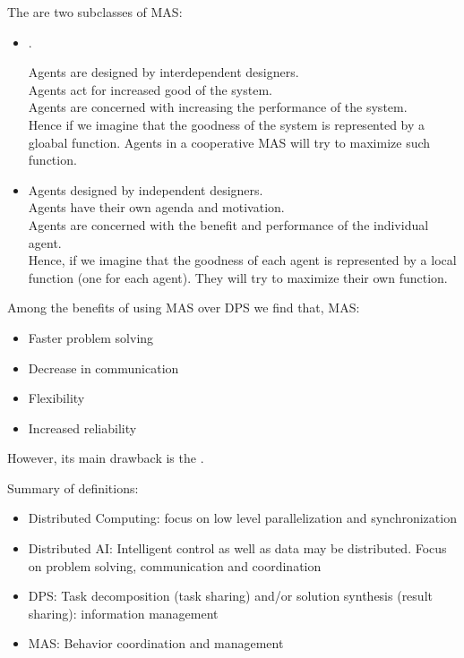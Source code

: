 The are two subclasses of MAS:
\begin{itemize}
\item {}.

Agents are designed by interdependent designers.\\
Agents act for increased good of the system.\\
Agents are concerned with increasing the performance of the system.\\

Hence if we imagine that the goodness of the system is represented by a gloabal function. Agents in a cooperative MAS will try to maximize such function.
\item {}

Agents designed by independent designers.\\
Agents have their own agenda and motivation.\\
Agents are concerned with the benefit and performance of the individual agent.\\

Hence, if we imagine that the goodness of each agent is represented by a local function (one for each agent). They will try to maximize their own function.	
\end{itemize}

Among the benefits of using MAS over DPS we find that, MAS:
\begin{itemize}
\item  Faster problem solving
\item Decrease in communication
\item  Flexibility
\item Increased reliability
\end{itemize}
However, its main drawback is the .

\vfill
Summary of definitions:
\begin{itemize}
\item Distributed Computing: focus on low level parallelization and synchronization
\item Distributed AI: Intelligent control as well as data may be distributed. Focus on problem solving, communication and coordination
\item DPS: Task decomposition (task sharing) and/or solution synthesis (result sharing): information management
\item MAS: Behavior coordination and management
\end{itemize}
\newpage

